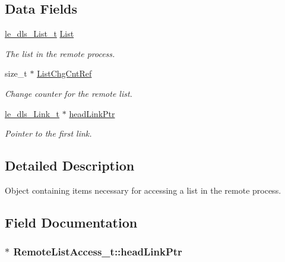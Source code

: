 \subsection*{Data Fields}
\begin{DoxyCompactItemize}
\item 
\hyperlink{structle__dls___list__t}{le\+\_\+dls\+\_\+\+List\+\_\+t} \hyperlink{struct_remote_list_access__t_a0beca8c72c6c97e32b1bdd8b6fe2d63c}{List}
\begin{DoxyCompactList}\small\item\em The list in the remote process. \end{DoxyCompactList}\item 
size\+\_\+t $\ast$ \hyperlink{struct_remote_list_access__t_aace368b0efa95eee15471dd07bf90006}{List\+Chg\+Cnt\+Ref}
\begin{DoxyCompactList}\small\item\em Change counter for the remote list. \end{DoxyCompactList}\item 
\hyperlink{structle__dls___link__t}{le\+\_\+dls\+\_\+\+Link\+\_\+t} $\ast$ \hyperlink{struct_remote_list_access__t_a33acb6b1619452c16d63195b94e42a79}{head\+Link\+Ptr}
\begin{DoxyCompactList}\small\item\em Pointer to the first link. \end{DoxyCompactList}\end{DoxyCompactItemize}


\subsection{Detailed Description}
Object containing items necessary for accessing a list in the remote process. 

\subsection{Field Documentation}
\subsubsection[{\texorpdfstring{head\+Link\+Ptr}{headLinkPtr}}]{$\ast$ Remote\+List\+Access\+\_\+t\+::head\+Link\+Ptr}\hypertarget{struct_remote_list_access__t_a33acb6b1619452c16d63195b94e42a79}{}\label{struct_remote_list_access__t_a33acb6b1619452c16d63195b94e42a79}


